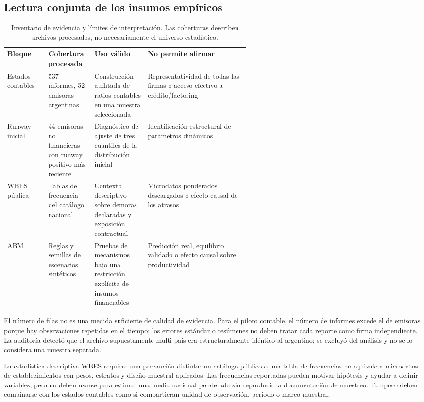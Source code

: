 \documentclass[11pt,a4paper]{article}
\begin{document}
\subsection{Lectura conjunta de los insumos empíricos}
\begin{table}[htbp]\centering\small
\begin{tabularx}{\linewidth}{p{0.17\linewidth}p{0.19\linewidth}p{0.22\linewidth}X}
\toprule
Bloque & Cobertura procesada & Uso válido & No permite afirmar\\
\midrule
Estados contables & 537 informes, 52 emisoras argentinas & Construcción auditada de ratios contables en una muestra seleccionada & Representatividad de todas las firmas o acceso efectivo a crédito/factoring\\
Runway inicial & 44 emisoras no financieras con runway positivo más reciente & Diagnóstico de ajuste de tres cuantiles de la distribución inicial & Identificación estructural de parámetros dinámicos\\
WBES pública & Tablas de frecuencia del catálogo nacional & Contexto descriptivo sobre demoras declaradas y exposición contractual & Microdatos ponderados descargados o efecto causal de los atrasos\\
ABM & Reglas y semillas de escenarios sintéticos & Pruebas de mecanismos bajo una restricción explícita de insumos financiables & Predicción real, equilibrio validado o efecto causal sobre productividad\\
\bottomrule
\end{tabularx}
\caption{Inventario de evidencia y límites de interpretación. Las coberturas describen archivos procesados, no necesariamente el universo estadístico.}\label{tab:evidence_inventory}
\end{table}

El número de filas no es una medida suficiente de calidad de evidencia. Para el piloto contable, el número de informes excede el de emisoras porque hay observaciones repetidas en el tiempo; los errores estándar o resúmenes no deben tratar cada reporte como firma independiente. La auditoría detectó que el archivo supuestamente multi-país era estructuralmente idéntico al argentino; se excluyó del análisis y no se lo considera una muestra separada.

La estadística descriptiva WBES requiere una precaución distinta: un catálogo público o una tabla de frecuencias no equivale a microdatos de establecimientos con pesos, estratos y diseño muestral aplicados. Las frecuencias reportadas pueden motivar hipótesis y ayudar a definir variables, pero no deben usarse para estimar una media nacional ponderada sin reproducir la documentación de muestreo. Tampoco deben combinarse con los estados contables como si compartieran unidad de observación, período o marco muestral.
\end{document}
